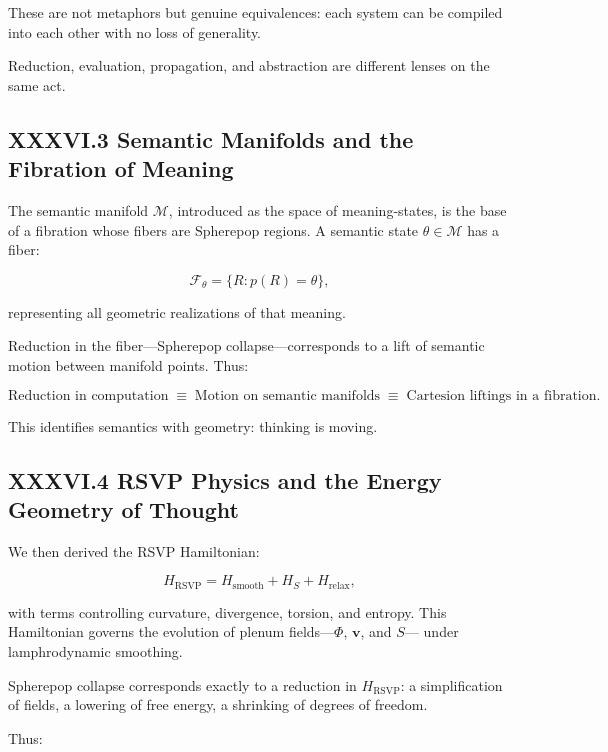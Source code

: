 \documentclass[12pt,letterpaper]{article}
\begin{document}
These are not metaphors but genuine equivalences:
each system can be compiled into each other with no loss of generality.

Reduction, evaluation, propagation, and abstraction are 
different lenses on the same act.

\subsection{XXXVI.3 Semantic Manifolds and the Fibration of Meaning}

The semantic manifold $\mathcal{M}$, introduced as the space of meaning-states,
is the base of a fibration whose fibers are Spherepop regions.  
A semantic state $\theta \in \mathcal{M}$ has a fiber:

\[
\mathcal{F}_\theta = \{ R : p(R) = \theta \},
\]

representing all geometric realizations of that meaning.

Reduction in the fiber—Spherepop collapse—corresponds to a lift of semantic motion 
between manifold points.  
Thus:

\[
\text{Reduction in computation}
\;\equiv\;
\text{Motion on semantic manifolds}
\;\equiv\;
\text{Cartesion liftings in a fibration}.
\]

This identifies semantics with geometry:  
thinking is moving.

\subsection{XXXVI.4 RSVP Physics and the Energy Geometry of Thought}

We then derived the RSVP Hamiltonian:

\[
H_{\text{RSVP}}
= H_{\text{smooth}}
+ H_S
+ H_{\text{relax}},
\]

with terms controlling curvature, divergence, torsion, and entropy.  
This Hamiltonian governs the evolution of plenum fields—$\Phi$, $\mathbf{v}$, and $S$—
under lamphrodynamic smoothing.

Spherepop collapse corresponds exactly to a reduction in $H_{\text{RSVP}}$:
a simplification of fields,
a lowering of free energy,
a shrinking of degrees of freedom.

Thus:
\end{document}
